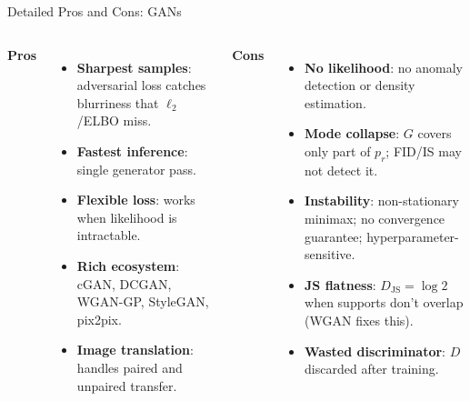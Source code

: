\documentclass[aspectratio=169,11pt]{beamer}
\newcommand{\JS}{D_{\mathrm{JS}}} %
\begin{document}
\begin{frame}{Detailed Pros and Cons: GANs}
\begin{columns}[T]
\textcolor{green!60!black}{\textbf{Pros}}
\begin{itemize}\footnotesize\setlength\itemsep{2pt}
  \item \textbf{Sharpest samples}: adversarial loss catches blurriness
        that $\ell_2$/ELBO miss.
  \item \textbf{Fastest inference}: single generator pass.
  \item \textbf{Flexible loss}: works when likelihood is intractable.
  \item \textbf{Rich ecosystem}: cGAN, DCGAN, WGAN-GP, StyleGAN, pix2pix.
  \item \textbf{Image translation}: handles paired and unpaired transfer.
\end{itemize}

\textcolor{red!60!black}{\textbf{Cons}}
\begin{itemize}\footnotesize\setlength\itemsep{2pt}
  \item \textbf{No likelihood}: no anomaly detection or density estimation.
  \item \textbf{Mode collapse}: $G$ covers only part of $p_r$;
        FID/IS may not detect it.
  \item \textbf{Instability}: non-stationary minimax; no convergence
        guarantee; hyperparameter-sensitive.
  \item \textbf{JS flatness}: $\JS\!=\!\log 2$ when supports don't overlap
        (WGAN fixes this).
  \item \textbf{Wasted discriminator}: $D$ discarded after training.
\end{itemize}
\end{columns}
\end{frame}
\end{document}
